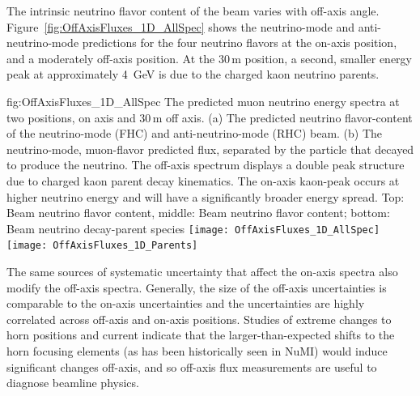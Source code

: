 The intrinsic neutrino flavor content of the beam varies with off-axis angle. Figure~\ref{fig:OffAxisFluxes_1D_AllSpec} shows the neutrino-mode and anti-neutrino-mode predictions for the four neutrino flavors at the on-axis position, and a moderately off-axis position. At the $30\,\textrm{m}$ position, a second, smaller energy peak at approximately \SI{4}{GeV} is due to the charged kaon neutrino parents. 


\begin{dunefigure}{fig:OffAxisFluxes_1D_AllSpec}
{The predicted muon neutrino energy spectra at two  positions, on axis and $30\,\textrm{m}$ off axis. (a) The predicted neutrino flavor-content of the neutrino-mode (FHC) and anti-neutrino-mode (RHC) beam. (b) The neutrino-mode, muon-flavor predicted flux, separated by the particle that decayed to produce the neutrino. The off-axis spectrum displays a double peak structure due to charged kaon parent decay kinematics. The on-axis kaon-peak occurs at higher neutrino energy and will have a significantly broader energy spread. Top: Beam neutrino flavor content, middle: Beam neutrino flavor content; bottom: Beam neutrino decay-parent species}
    \texttt{[image: OffAxisFluxes\_1D\_AllSpec]}
  \texttt{[image: OffAxisFluxes\_1D\_Parents]}    
    \end{dunefigure}


The same sources of systematic uncertainty that affect the on-axis spectra also modify the off-axis spectra.  Generally, the size of the off-axis uncertainties is comparable to the on-axis uncertainties and the uncertainties are highly correlated across off-axis and on-axis positions. Studies of extreme changes to horn positions and current indicate that the larger-than-expected shifts to the horn focusing elements (as has been historically seen in NuMI) would induce significant changes off-axis, and so off-axis flux measurements are useful to diagnose beamline physics.


%
